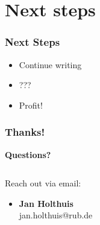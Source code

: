 \documentclass[
    alternativetitlepage=alternativ,
    cornerlogo=hgi_nds_logo2,
    sectionoverview,
]{rubpresentation}
\begin{document}
\section{Next steps}

\begin{frame}
    \frametitle{Next Steps}
    \begin{itemize}
        \item{} Continue writing
        \item{} ???
        \item{} Profit!
    \end{itemize}
\end{frame}


\begin{frame}[plain]
\frametitle{Thanks!}
 \begin{center}
 {\bfseries\fontsize{30pt}{1.2em}\selectfont Questions?}
 \end{center}
  \begin{columns}
    \begin{column}{0.5\textwidth}
      \begin{center}
        Reach out via email:
        \begin{itemize}
        \item \textbf{Jan Holthuis}\\
              jan.holthuis@rub.de
        \end{itemize}
      \end{center}
    \end{column}
    \begin{column}{0.5\textwidth}
      \begin{center}
      \end{center}
    \end{column}
  \end{columns}
\end{frame}
\end{document}
